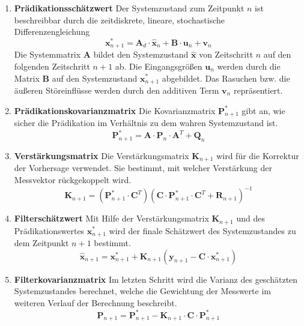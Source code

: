 \begin{enumerate}
	\item \textbf{Prädikationsschätzwert}
	\newline
	Der Systemzustand zum Zeitpunkt $n$ ist beschreibbar durch die zeitdiskrete, lineare, stochastische Differenzengleichung
	\begin{equation}
	\boldsymbol{x}^*_{n+1} = \boldsymbol{A}_d \cdot \boldsymbol{\hat{x}}_n + \boldsymbol{B} \cdot \boldsymbol{u}_n + \boldsymbol{v}_n
	\end{equation}
	Die Systemmatrix $\boldsymbol{A}$ bildet den Systemzustand $\boldsymbol{\hat{x}}$ von Zeitschritt $n$ auf den folgenden Zeitschritt $n+1$ ab. Die Eingangsgrößen $\boldsymbol{u}_n$ werden durch die Matrix $\boldsymbol{B}$ auf den Systemzustand $\boldsymbol{x}^*_{n+1}$ abgebildet. Das Rasuchen bzw. die äußeren Störeinflüsse werden durch den additiven Term $\boldsymbol{v}_n$ repräsentiert.
	\item \textbf{Prädikationskovarianzmatrix}
	\newline
	Die Kovarianzmatrix $\boldsymbol{P}^*_{n+1}$ gibt an, wie sicher die Prädikation im Verhältnis zu dem wahren Systemzustand ist.
	\begin{equation}
	\boldsymbol{P}^*_{n+1} = \boldsymbol{A} \cdot \boldsymbol{\hat{P}}_n \cdot \boldsymbol{A}^T + \boldsymbol{Q}_n
	\end{equation}
	\item \textbf{Verstärkungsmatrix} \newline
	Die Verstärkungsmatrix $\boldsymbol{K}_{n+1}$ wird für die Korrektur der Vorhersage verwendet. Sie bestimmt, mit welcher Verstärkung der Messvektor rückgekoppelt wird.
	\begin{equation}
	\boldsymbol{K}_{n+1} = (\boldsymbol{P}^*_{n+1} \cdot \boldsymbol{C}^T)(\boldsymbol{C} \cdot \boldsymbol{P}^*_{n+1} \cdot \boldsymbol{C}^T + \boldsymbol{R}_{n+1})^{-1}
	\end{equation}
	\item \textbf{Filterschätzwert}
	Mit Hilfe der Verstärkungsmatrix $\boldsymbol{K}_{n+1}$ und des Prädikationswertes $\boldsymbol{x}^*_{n+1}$ wird der finale Schätzwert des Systemzustandes zu dem Zeitpunkt $n+1$ bestimmt.
	\begin{equation}
	\boldsymbol{\hat{x}}_{n+1} = \boldsymbol{x}^*_{n+1} + \boldsymbol{K}_{n+1}(\boldsymbol{y}_{n+1} - \boldsymbol{C} \cdot \boldsymbol{x}^*_{n+1})
	\end{equation}
	\item \textbf{Filterkovarianzmatrix}
	Im letzten Schritt wird die Varianz des geschätzten Systemzustandes berechnet, welche die Gewichtung der Messwerte im weiteren Verlauf der Berechnung beschreibt.
	\begin{equation}
	\boldsymbol{\hat{P}}_{n+1} = \boldsymbol{P}^*_{n+1} - \boldsymbol{K}_{n+1} \cdot \boldsymbol{C} \cdot \boldsymbol{P}^*_{n+1}
	\end{equation}
\end{enumerate}

